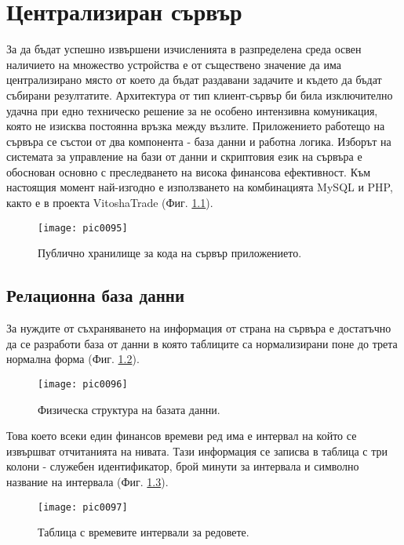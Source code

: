 \newpage
\chapter{Централизиран сървър}
\label{chapter05}

За да бъдат успешно извършени изчисленията в разпределена среда освен наличието на множество устройства е от съществено значение да има централизирано място от което да бъдат раздавани задачите и където да бъдат събирани резултатите. Архитектура от тип клиент-сървър би била изключително удачна при едно техническо решение за не особено интензивна комуникация, която не изисква постоянна връзка между възлите. Приложението работещо на сървъра се състои от два компонента - база данни и работна логика. Изборът на системата за управление на бази от данни и скриптовия език на сървъра е обоснован основно с преследването на висока финансова ефективност. Към настоящия момент най-изгодно е използването на комбинацията MySQL и PHP, както е в проекта VitoshaTrade\cite{vtrade} (Фиг. \ref{fig:pic0095}).

\begin{figure}[h]
  \centering
  \texttt{[image: pic0095]}
  \caption{Публично хранилище за кода на сървър приложението.}
\label{fig:pic0095}
\end{figure}
\FloatBarrier

\section{Релационна база данни}

За нуждите от съхраняването на информация от страна на сървъра е достатъчно да се разработи база от данни в която таблиците са нормализирани поне до трета нормална форма (Фиг. \ref{fig:pic0096}).

\begin{figure}[h]
  \centering
  \texttt{[image: pic0096]}
  \caption{Физическа структура на базата данни.}
\label{fig:pic0096}
\end{figure}
\FloatBarrier

Това което всеки един финансов времеви ред има е интервал на който се извършват отчитанията на нивата. Тази информация се записва в таблица с три колони - служебен идентификатор, брой минути за интервала и символно название на интервала (Фиг. \ref{fig:pic0097}).

\begin{figure}[h]
  \centering
  \texttt{[image: pic0097]}
  \caption{Таблица с времевите интервали за редовете.}
\label{fig:pic0097}
\end{figure}
\FloatBarrier

